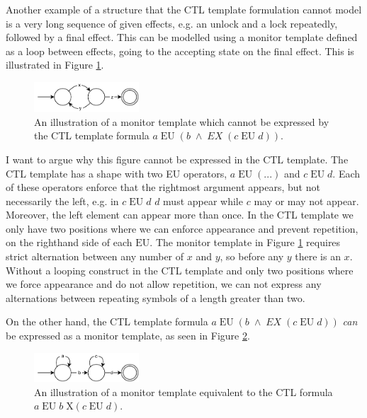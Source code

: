 \newpar Another example of a structure that the CTL template formulation cannot model is a very long sequence of given effects, e.g. an unlock and a lock repeatedly, followed by a final effect. This can be modelled using a monitor template defined as a loop between effects, going to the accepting state on the final effect. This is illustrated in Figure \ref{long-monitor}. 

\begin{figure}[H]
    \centering
    \includegraphics[width=0.35\textwidth]{evaluation/figures/long-monitor}
    \caption{An illustration of a monitor template which cannot be expressed by the CTL template formula $a\;\text{EU}\;(b\;\land\;EX\;(c\;\text{EU}\;d))$.}
    \label{long-monitor}
\end{figure}

\newpar I want to argue why this figure cannot be expressed in the CTL template. The CTL template has a shape with two EU operators, $a\;\text{EU}\;(...)$ and $c\;\text{EU}\;d$. Each of these operators enforce that the rightmost argument appears, but not necessarily the left, e.g. in $c\;\text{EU}\;d$ $d$ must appear while $c$ may or may not appear. Moreover, the left element can appear more than once. In the CTL template we only have two positions where we can enforce appearance and prevent repetition, on the righthand side of each $\text{EU}$. The monitor template in Figure \ref{long-monitor} requires strict alternation between any number of $x$ and $y$, so before any $y$ there is an $x$. Without a looping construct in the CTL template and only two positions where we force appearance and do not allow repetition, we can not express any alternations between repeating symbols of a length greater than two. 

\newpar On the other hand, the CTL template formula $a\;\text{EU}\;(b\;\land\;EX\;(c\;\text{EU}\;d))$ \textit{can} be expressed as a monitor template, as seen in Figure \ref{ctl-as-monitor}. 

\begin{figure}[H]
    \centering
    \includegraphics[width=0.35\textwidth]{evaluation/figures/ctl-as-monitor}
    \caption{An illustration of a monitor template equivalent to the CTL formula $a\;\text{EU}\;b\;\text{X}(c\;\text{EU}\;d)$.}
    \label{ctl-as-monitor}
\end{figure}

